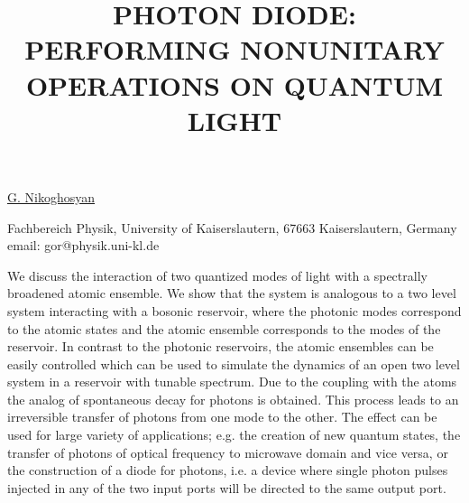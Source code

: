 \title{PHOTON DIODE: PERFORMING NONUNITARY OPERATIONS ON QUANTUM LIGHT}

\underline{G. Nikoghosyan}


Fachbereich Physik,
University of Kaiserslautern,
67663 Kaiserslautern,
Germany\\
email: gor@physik.uni-kl.de

We discuss the interaction of two quantized modes of light with a spectrally broadened atomic ensemble. We show that the system is analogous to a two level system interacting with a bosonic reservoir, where the photonic modes correspond to the atomic states and the atomic ensemble corresponds to the modes of the reservoir. In contrast to the photonic reservoirs, the atomic ensembles can be easily controlled which can be used to simulate the dynamics of an open two level system in a reservoir with tunable spectrum. Due to the coupling with the atoms the analog of spontaneous decay for photons is obtained. This process leads to an irreversible transfer of photons from one mode to the other. The effect can be used for large variety of applications; e.g. the creation of new quantum states, the transfer of photons of optical frequency to microwave domain and vice versa, or the construction of a diode for photons, i.e. a device where single photon pulses injected in any of the two input ports will be directed to the same output port.

\vspace{\baselineskip}